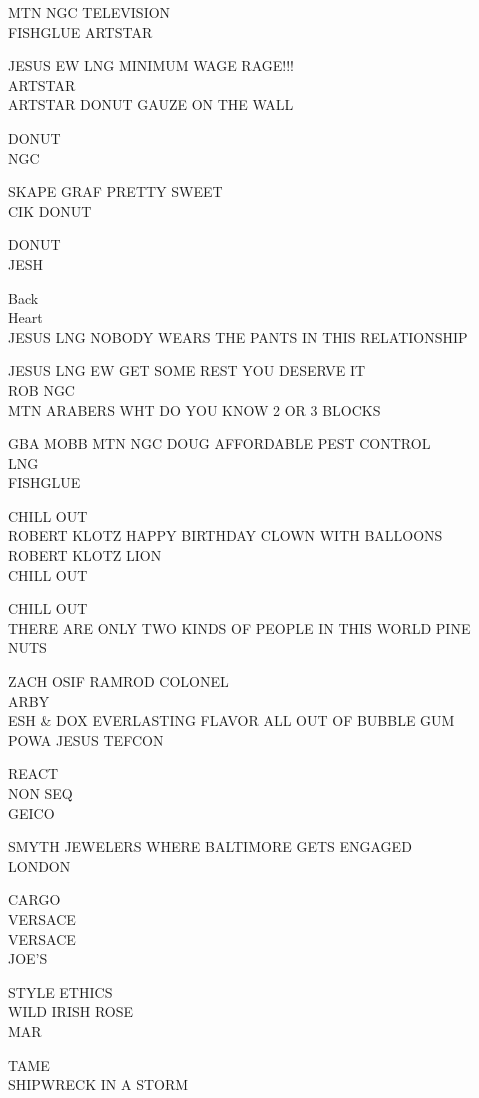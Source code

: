 \documentclass[10pt,letterpaper]{article}
\begin{document}
MTN NGC TELEVISION\\
FISHGLUE ARTSTAR

JESUS EW LNG MINIMUM WAGE RAGE!!!\\
ARTSTAR\\
ARTSTAR DONUT GAUZE ON THE WALL

DONUT\\
NGC

SKAPE GRAF PRETTY SWEET\\
CIK DONUT

DONUT\\
JESH

Back\\
Heart\\
JESUS LNG NOBODY WEARS THE PANTS IN THIS RELATIONSHIP

JESUS LNG EW GET SOME REST YOU DESERVE IT\\
ROB NGC\\
MTN ARABERS WHT DO YOU KNOW 2 OR 3 BLOCKS

GBA MOBB MTN NGC DOUG AFFORDABLE PEST CONTROL\\
LNG\\
FISHGLUE

CHILL OUT\\
ROBERT KLOTZ HAPPY BIRTHDAY CLOWN WITH BALLOONS\\
ROBERT KLOTZ LION\\
CHILL OUT

CHILL OUT\\
THERE ARE ONLY TWO KINDS OF PEOPLE IN THIS WORLD PINE NUTS

ZACH OSIF RAMROD COLONEL\\
ARBY\\
ESH \& DOX EVERLASTING FLAVOR ALL OUT OF BUBBLE GUM\\
POWA JESUS TEFCON

REACT\\
NON SEQ\\
GEICO

SMYTH JEWELERS WHERE BALTIMORE GETS ENGAGED\\
LONDON

CARGO\\
VERSACE\\
VERSACE\\
JOE'S

STYLE ETHICS\\
WILD IRISH ROSE\\
MAR

TAME\\
SHIPWRECK IN A STORM
\end{document}
